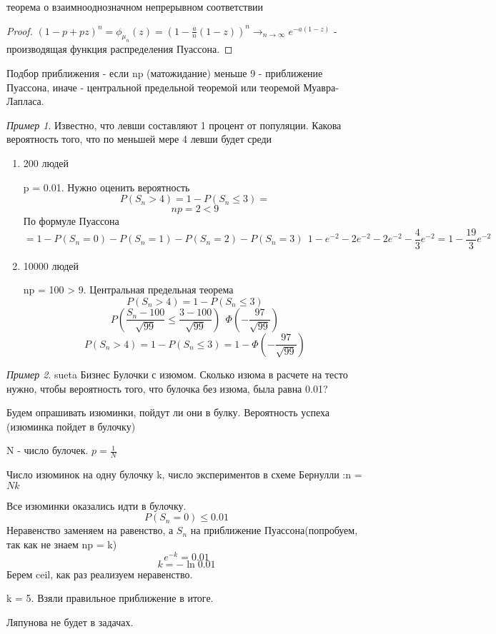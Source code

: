 \documentclass[a4paper]{article}
\theoremstyle{definition}
\theoremstyle{remark}
\newtheorem*{example}{Пример}
\begin{document}
теорема о взаимнооднозначном непрерывном соответствии
\begin{proof}
    $(1-p+pz)^n = \phi_{\mu_n}(z)=  (1-\frac{a}{n}(1-z))^n \to_{n\to \infty} e^{-a(1-z)}$ - производящая функция распределения Пуассона.
\end{proof}
Подбор приближения - если np (матожидание) меньше 9 - приближение Пуассона, иначе - центральной предельной теоремой или теоремой Муавра-Лапласа.
\begin{example}
    Известно, что левши составляют 1 процент от популяции. Какова вероятность того, что по меньшей мере 4 левши будет среди
    \begin{enumerate}
        \item 200 людей

        p = 0.01. Нужно оценить вероятность
    \[P(S_n > 4) = 1 - P(S_n\le 3)=\]
    \[np = 2 < 9\]
    По формуле Пуассона 
    \[= 1 - P(S_n = 0) - P(S_n = 1) - P(S_n = 2) - P(S_n = 3) ~~ 1 - e^{-2} - 2e^{-2} - 2e^{-2} - \frac43 e^{-2} = 1 - \frac{19}3e^{-2}\]
    
        \item 10000 людей

        np = 100 > 9. Центральная предельная теорема
        \[P(S_n > 4) = 1 - P(S_n\le 3)\]
        \[P(\frac{S_n - 100}{\sqrt{99}} \le \frac{3 - 100}{\sqrt{99}}) ~~ \Phi(-\frac{97}{\sqrt{99}})\]
        \[P(S_n > 4) = 1 - P(S_n\le 3) = 1 - \Phi(-\frac{97}{\sqrt{99}})\]
    \end{enumerate}
\end{example}
\begin{example}
    sueta
    Бизнес
    Булочки с изюмом. Сколько изюма в расчете на тесто нужно, чтобы вероятность того, что булочка без изюма, была равна 
    0.01?

    Будем опрашивать изюминки, пойдут ли они в булку. Вероятность успеха (изюминка пойдет в булочку)

    N - число булочек. $p = \frac{1}{N}$

    Число изюминок на одну булочку k, число экспериментов в схеме Бернулли :n = $Nk$
    
    Все изюминки оказались идти в булочку.
    \[P(S_n = 0)\le 0.01\]
    Неравенство заменяем на равенство, а $S_n$ на приближение Пуассона(попробуем, так как не знаем np = k)
    \[e^{-k} = 0.01\]
    \[k = -\ln{0.01}\]
    Берем ceil, как раз реализуем неравенство.

    k = 5. Взяли правильное приближение в итоге.
\end{example}
Ляпунова не будет в задачах.
\end{document}
